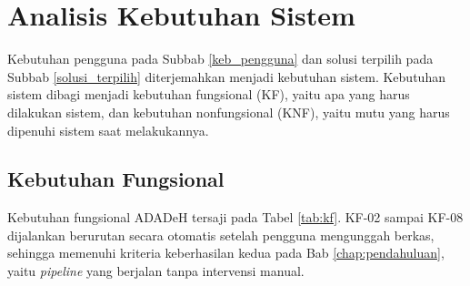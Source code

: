\section{Analisis Kebutuhan Sistem}
\label{keb_sistem}

Kebutuhan pengguna pada Subbab \ref{keb_pengguna} dan solusi terpilih pada Subbab \ref{solusi_terpilih} diterjemahkan menjadi kebutuhan sistem. Kebutuhan sistem dibagi menjadi kebutuhan fungsional (KF), yaitu apa yang harus dilakukan sistem, dan kebutuhan nonfungsional (KNF), yaitu mutu yang harus dipenuhi sistem saat melakukannya.

\subsection{Kebutuhan Fungsional}
\label{kf}

Kebutuhan fungsional ADADeH tersaji pada Tabel \ref{tab:kf}. KF-02 sampai KF-08 dijalankan berurutan secara otomatis setelah pengguna mengunggah berkas, sehingga memenuhi kriteria keberhasilan kedua pada Bab \ref{chap:pendahuluan}, yaitu \textit{pipeline} yang berjalan tanpa intervensi manual.

